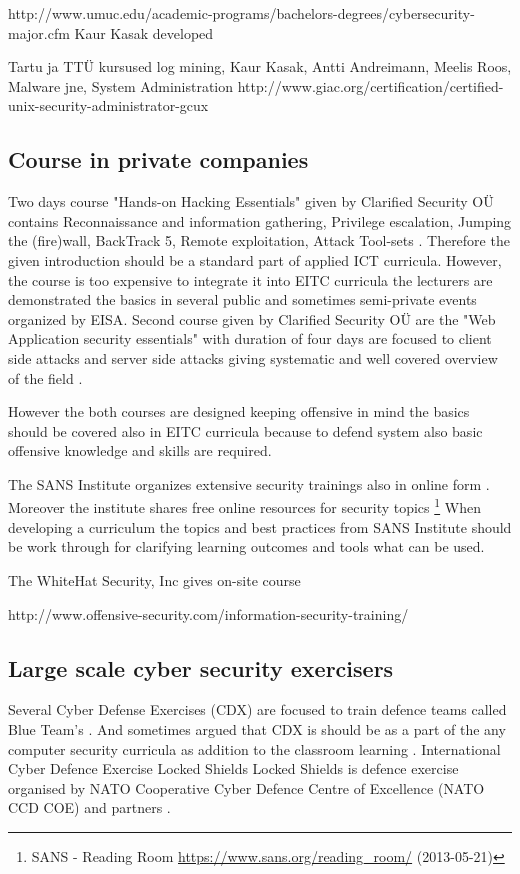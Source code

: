 http://www.umuc.edu/academic-programs/bachelors-degrees/cybersecurity-major.cfm
Kaur Kasak developed 
{\color{red}


Tartu ja TTÜ kursused
log mining, Kaur Kasak, Antti Andreimann, Meelis Roos, Malware jne, System Administration
http://www.giac.org/certification/certified-unix-security-administrator-gcux
}

\subsection{Course in private companies}

Two days course "Hands-on Hacking Essentials" given by Clarified Security OÜ contains Reconnaissance and information gathering, Privilege escalation, Jumping the (fire)wall, BackTrack 5, Remote exploitation, Attack Tool-sets \citep{website:clarifiedsecurity_hohe}. Therefore the given introduction should be a standard part of applied \gls{ICT} curricula. However, the course is too expensive to integrate it into \gls{EITC} curricula the lecturers are demonstrated the basics in several public and sometimes semi-private events organized by \gls{EISA}. Second course given by Clarified Security OÜ are the "Web Application security essentials" with duration of four days are focused to client side attacks and server side attacks giving systematic and well covered overview of the field \citep{website:clarifiedsecurity_hohe}.

However the both courses are designed keeping offensive in mind the basics should be covered also in \gls{EITC} curricula because to defend system also basic offensive knowledge and skills are required.

The SANS Institute organizes extensive security trainings also in online form \citep{website:SANS}. Moreover the institute shares free online resources for security topics \footnote{SANS - Reading Room \url{https://www.sans.org/reading_room/} (2013-05-21)} When developing a curriculum the topics and best practices from SANS Institute should be work through for clarifying learning outcomes and tools what can be used.

The WhiteHat Security, Inc gives on-site course 


http://www.offensive-security.com/information-security-training/

\subsection{Large scale cyber security exercisers}
Several Cyber Defense Exercises (\gls{CDX}) are focused to train defence teams called Blue Team's \citep{website:NATO_CCD_COE,schepens_CDX}. And sometimes argued that \gls{CDX} is should be as a part of the any computer security curricula as addition to the classroom learning \citep{adams_CDX_curricula}. International Cyber Defence Exercise Locked Shields Locked Shields is defence exercise organised by NATO Cooperative Cyber Defence Centre of Excellence (\gls{NATO CCD COE}) and partners  \citep{website:NATO_CCD_COE}. 

